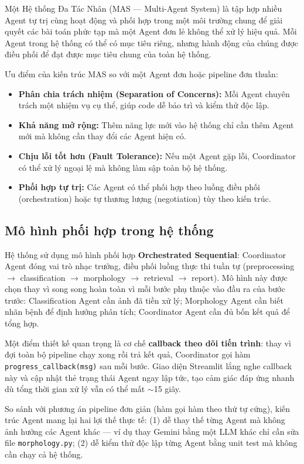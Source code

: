 Một Hệ thống Đa Tác Nhân (MAS --- Multi-Agent System) là tập hợp nhiều Agent tự trị cùng hoạt động và phối hợp trong một môi trường chung để giải quyết các bài toán phức tạp mà một Agent đơn lẻ không thể xử lý hiệu quả. Mỗi Agent trong hệ thống có thể có mục tiêu riêng, nhưng hành động của chúng được điều phối để đạt được mục tiêu chung của toàn hệ thống.

Ưu điểm của kiến trúc MAS so với một Agent đơn hoặc pipeline đơn thuần:

\begin{itemize}[leftmargin=1.5cm]
    \item \textbf{Phân chia trách nhiệm (Separation of Concerns):} Mỗi Agent chuyên trách một nhiệm vụ cụ thể, giúp code dễ bảo trì và kiểm thử độc lập.
    \item \textbf{Khả năng mở rộng:} Thêm năng lực mới vào hệ thống chỉ cần thêm Agent mới mà không cần thay đổi các Agent hiện có.
    \item \textbf{Chịu lỗi tốt hơn (Fault Tolerance):} Nếu một Agent gặp lỗi, Coordinator có thể xử lý ngoại lệ mà không làm sập toàn bộ hệ thống.
    \item \textbf{Phối hợp tự trị:} Các Agent có thể phối hợp theo luồng điều phối (orchestration) hoặc tự thương lượng (negotiation) tùy theo kiến trúc.
\end{itemize}

\subsection{Mô hình phối hợp trong hệ thống}
Hệ thống sử dụng mô hình phối hợp \textbf{Orchestrated Sequential}: Coordinator Agent đóng vai trò nhạc trưởng, điều phối luồng thực thi tuần tự (preprocessing $\rightarrow$ classification $\rightarrow$ morphology $\rightarrow$ retrieval $\rightarrow$ report). Mô hình này được chọn thay vì song song hoàn toàn vì mỗi bước phụ thuộc vào đầu ra của bước trước: Classification Agent cần ảnh đã tiền xử lý; Morphology Agent cần biết nhãn bệnh để định hướng phân tích; Coordinator Agent cần đủ bốn kết quả để tổng hợp.

Một điểm thiết kế quan trọng là cơ chế \textbf{callback theo dõi tiến trình}: thay vì đợi toàn bộ pipeline chạy xong rồi trả kết quả, Coordinator gọi hàm \texttt{progress\_callback(msg)} sau mỗi bước. Giao diện Streamlit lắng nghe callback này và cập nhật thẻ trạng thái Agent ngay lập tức, tạo cảm giác đáp ứng nhanh dù tổng thời gian xử lý vẫn có thể mất $\sim$15 giây.

So sánh với phương án pipeline đơn giản (hàm gọi hàm theo thứ tự cứng), kiến trúc Agent mang lại hai lợi thế thực tế: (1) dễ thay thế từng Agent mà không ảnh hưởng các Agent khác --- ví dụ thay Gemini bằng một LLM khác chỉ cần sửa file \texttt{morphology.py}; (2) dễ kiểm thử độc lập từng Agent bằng unit test mà không cần chạy cả hệ thống.